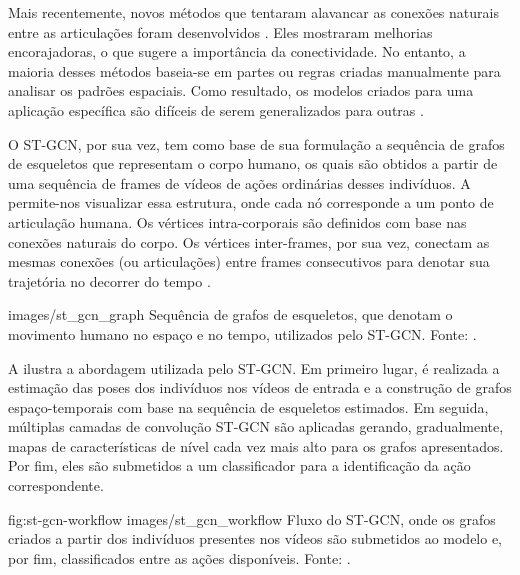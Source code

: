 
Mais recentemente, novos métodos que tentaram alavancar as conexões naturais entre as articulações foram desenvolvidos \cite{shahroudy-2016, yong-du-2015}. Eles mostraram melhorias encorajadoras, o que sugere a importância da conectividade. No entanto, a maioria desses métodos baseia-se em partes ou regras criadas manualmente para analisar os padrões espaciais. Como resultado, os modelos criados para uma aplicação específica são difíceis de serem generalizados para outras \cite{st-gcn-2018}.

O ST-GCN, por sua vez, tem como base de sua formulação a sequência de grafos de esqueletos que representam o corpo humano, os quais são obtidos a partir de uma sequência de frames de vídeos de ações ordinárias desses indivíduos. A  permite-nos visualizar essa estrutura, onde cada nó corresponde a um ponto de articulação humana. Os vértices intra-corporais são definidos com base nas conexões naturais do corpo. Os vértices inter-frames, por sua vez, conectam as mesmas conexões (ou articulações) entre frames consecutivos para denotar sua trajetória no decorrer do tempo \cite{st-gcn-2018}.

    {images/st_gcn_graph}
    {Sequência de grafos de esqueletos, que denotam o movimento humano no espaço e no tempo, utilizados pelo ST-GCN. Fonte: \cite[p. 1]{st-gcn-2018}.}

A  ilustra a abordagem utilizada pelo ST-GCN. Em primeiro lugar, é realizada a estimação das poses dos indivíduos nos vídeos de entrada e a construção de grafos espaço-temporais com base na sequência de esqueletos estimados. Em seguida, múltiplas camadas de convolução ST-GCN são aplicadas gerando, gradualmente, mapas de características de nível cada vez mais alto para os grafos apresentados. Por fim, eles são submetidos a um classificador para a identificação da ação correspondente.

\image
    {fig:st-gcn-workflow}
    {images/st_gcn_workflow}
    {Fluxo do ST-GCN, onde os grafos criados a partir dos indivíduos presentes nos vídeos são submetidos ao modelo e, por fim, classificados entre as ações disponíveis. Fonte: \cite[p. 3]{st-gcn-2018}.}



